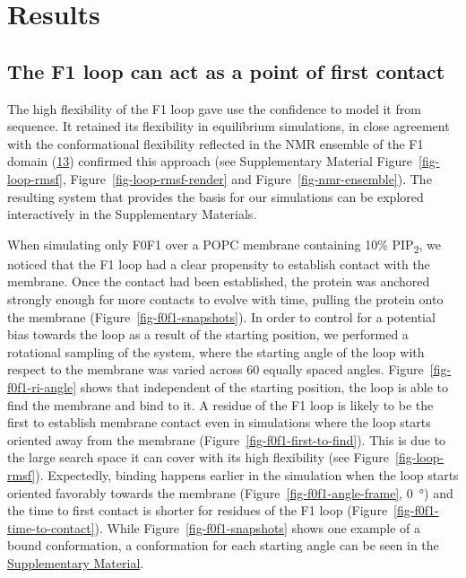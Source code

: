 \documentclass[
  twocolumn]{biophys-new-mod}
\begin{document}
\hypertarget{results}{%
\section{Results}\label{results}}

\hypertarget{the-f1-loop-can-act-as-a-point-of-first-contact}{%
\subsection{The F1 loop can act as a point of first
contact}\label{the-f1-loop-can-act-as-a-point-of-first-contact}}

The high flexibility of the F1 loop gave use the confidence to model it
from sequence. It retained its flexibility in equilibrium simulations,
in close agreement with the conformational flexibility reflected in the
NMR ensemble of the F1 domain
(\protect\hyperlink{ref-goultStructureDoubleUbiquitinlike2010}{13})
confirmed this approach (see Supplementary Material
Figure~\ref{fig-loop-rmsf}, Figure~\ref{fig-loop-rmsf-render} and
Figure~\ref{fig-nmr-ensemble}). The resulting system that provides the
basis for our simulations can be explored interactively in the
Supplementary Materials.

When simulating only F0F1 over a POPC membrane containing 10\%
PIP\textsubscript{2}, we noticed that the F1 loop had a clear propensity
to establish contact with the membrane. Once the contact had been
established, the protein was anchored strongly enough for more contacts
to evolve with time, pulling the protein onto the membrane
(Figure~\ref{fig-f0f1-snapshots}). In order to control for a potential
bias towards the loop as a result of the starting position, we performed
a rotational sampling of the system, where the starting angle of the
loop with respect to the membrane was varied across 60 equally spaced
angles. Figure~\ref{fig-f0f1-ri-angle} shows that independent of the
starting position, the loop is able to find the membrane and bind to it.
A residue of the F1 loop is likely to be the first to establish membrane
contact even in simulations where the loop starts oriented away from the
membrane (Figure~\ref{fig-f0f1-first-to-find}). This is due to the large
search space it can cover with its high flexibility (see
Figure~\ref{fig-loop-rmsf}). Expectedly, binding happens earlier in the
simulation when the loop starts oriented favorably towards the membrane
(Figure~\ref{fig-f0f1-angle-frame}, 0~°) and the time to first contact
is shorter for residues of the F1 loop
(Figure~\ref{fig-f0f1-time-to-contact}). While
Figure~\ref{fig-f0f1-snapshots} shows one example of a bound
conformation, a conformation for each starting angle can be seen in the
\protect\hyperlink{sec-system}{Supplementary Material}.
\end{document}
